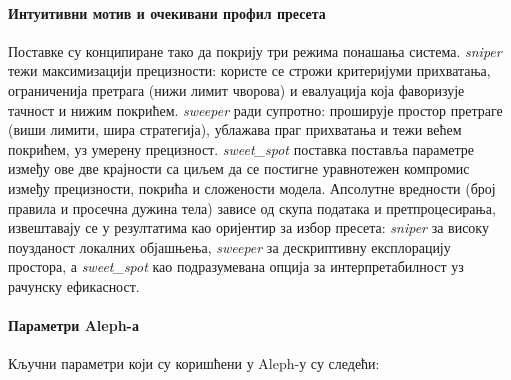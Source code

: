 \paragraph{Интуитивни мотив и очекивани профил пресета}
Поставке су конципиране тако да покрију три режима понашања система. \textit{sniper} тежи максимизацији прецизности: користе се строжи критеријуми прихватања, ограниченија претрага (нижи лимит чворова) и евалуација која фаворизује тачност и нижим покрићем. \textit{sweeper} ради супротно: проширује простор претраге (виши лимити, шира стратегија), ублажава праг прихватања и тежи већем покрићем, уз умерену прецизност. \textit{sweet\_spot} поставка поставља параметре између ове две крајности са циљем да се постигне уравнотежен компромис између прецизности, покрића и сложености модела. Апсолутне вредности (број правила и просечна дужина тела) зависе од скупа података и претпроцесирања, извештавају се у резултатима као оријентир за избор пресета: \emph{sniper} за високу поузданост локалних објашњења, \emph{sweeper} за дескриптивну експлорацију простора, а \emph{sweet\_spot} као подразумевана опција за интерпретабилност уз рачунску ефикасност.

\paragraph{Параметри Aleph-а} Кључни параметри који су коришћени у Aleph-у су следећи:

